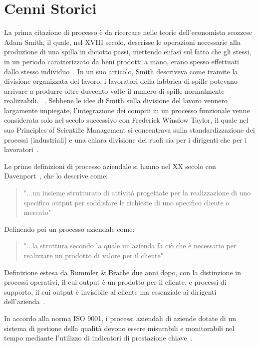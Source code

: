 \documentclass[12pt,a4paper]{report}
\begin{document}
    \section{Cenni Storici}
    La prima citazione di processo \`e da ricercare nelle
    teorie dell'economista scozzese Adam Smith, il quale,
    nel XVIII secolo, descrisse le operazioni necessarie
    alla produzione di una spilla in diciotto passi,
    mettendo enfasi sul fatto che gli stessi, in un periodo
    caratterizzato da beni prodotti a mano, erano spesso
    effettuati dallo stesso individuo~\cite{smith1827inquiry}.
    In un suo articolo, Smith descriveva come tramite la 
    divisione organizzata del lavoro, i lavoratori della 
    fabbrica di spille potevano arrivare a produrre oltre 
    duecento volte il numero di spille normalmente realizzabili. 
    ~\cite{business-process-handbook}.
    Sebbene le idee di Smith sulla divisione del lavoro
    vennero largamente impiegate, l'integrazione dei
    compiti in un processo funzionale venne considerata
    solo nel secolo successivo con Frederick Winslow Taylor, 
    il quale nel suo Principles of Scientific Management
    si concentrava sulla standardizzazione dei processi 
    (industriali) e una chiara divisione dei ruoli sia per
    i dirigenti che per i lavoratori~\cite{principlesscimanagement}.

    \medskip
    Le prime definizioni di processo aziendale si hanno nel
    XX secolo con Davenport~\cite{davenport1993process}, che lo 
    descrive come: 
    \begin{quote}
    "...un insieme strutturato di attivit\`a progettate per
    la realizzazione di uno specifico output per soddisfare
    le richieste di uno specifico cliente o mercato"
    \end{quote}
    Definendo poi un processo aziendale come:
    \begin{quote}
    "...la struttura secondo la quale un'azienda fa ci\`o 
    che \`e necessario per realizzare un prodotto di valore
    per il cliente"
    \end{quote}

    Definizione estesa da Rummler \& Brache due anni dopo,
    con la distinzione in processi operativi, il cui output \`e
    un prodotto per il cliente, e processi di supporto, 
    il cui output \`e invisibile al cliente ma essenziale
    ai dirigenti dell'azienda~\cite{rummler1990improving}. 

    \medskip
    In accordo alla norma ISO 9001, i processi aziendali
    di aziende dotate di un sistema di gestione della
    qualit\`a devono essere misurabili e monitorabili nel
    tempo mediante l'utilizzo di indicatori di prestazione
    chiave~\cite{iso9001}.
    
\end{document}
